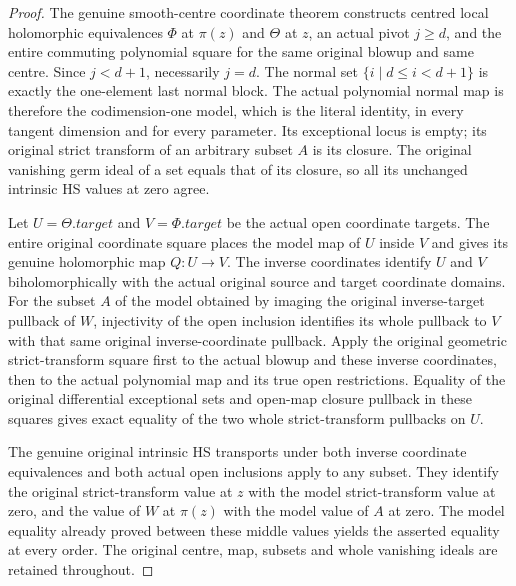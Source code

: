 \begin{proof}
The genuine smooth-centre coordinate theorem constructs centred local
holomorphic equivalences $\Phi$ at $\pi(z)$ and $\Theta$ at $z$, an
actual pivot $j\ge d$, and the entire commuting polynomial square for
the same original blowup and same centre. Since $j<d+1$, necessarily
$j=d$. The normal set $\{i\mid d\le i<d+1\}$ is exactly the one-element
last normal block. The actual polynomial normal map is therefore the
codimension-one model, which is the literal identity, in every tangent
dimension and for every parameter. Its exceptional locus is empty;
its original strict transform of an arbitrary subset $A$ is its closure.
The original vanishing germ ideal of a set equals that of its closure,
so all its unchanged intrinsic HS values at zero agree.

Let $U=\Theta.target$ and $V=\Phi.target$ be the actual open coordinate
targets. The entire original coordinate square places the model map of
$U$ inside $V$ and gives its genuine holomorphic map $Q:U\to V$.
The inverse coordinates identify $U$ and $V$ biholomorphically with
the actual original source and target coordinate domains. For the
subset $A$ of the model obtained by imaging the original inverse-target
pullback of $W$, injectivity of the open inclusion identifies its whole
pullback to $V$ with that same original inverse-coordinate pullback.
Apply the original geometric strict-transform square first to the actual
blowup and these inverse coordinates, then to the actual polynomial map
and its true open restrictions. Equality of the original differential
exceptional sets and open-map closure pullback in these squares gives
exact equality of the two whole strict-transform pullbacks on $U$.

The genuine original intrinsic HS transports under both inverse
coordinate equivalences and both actual open inclusions apply to any
subset. They identify the original strict-transform value at $z$ with
the model strict-transform value at zero, and the value of $W$ at
$\pi(z)$ with the model value of $A$ at zero. The model equality already
proved between these middle values yields the asserted equality at
every order. The original centre, map, subsets and whole vanishing
ideals are retained throughout.
\end{proof}

